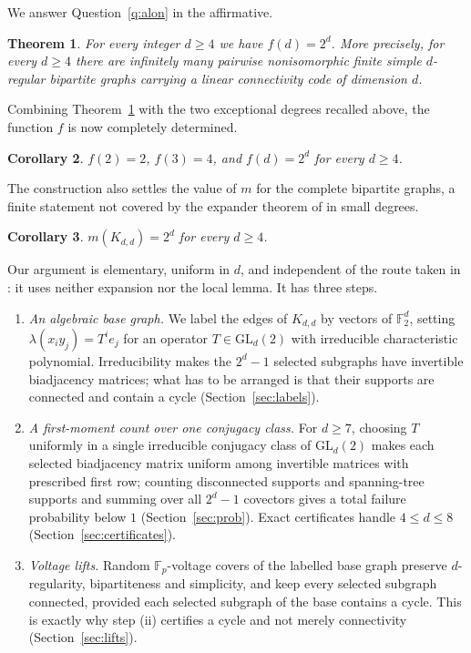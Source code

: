 \documentclass[11pt,reqno]{amsart}
\theoremstyle{plain}
\newtheorem{theorem}{Theorem}[section]
\newtheorem{corollary}[theorem]{Corollary}
\theoremstyle{definition}
\newcommand{\FF}{\mathbb{F}}
\newcommand{\GL}{\mathrm{GL}}
\begin{document}
We answer Question~\ref{q:alon} in the affirmative.

\begin{theorem}\label{thm:main}
For every integer $d\ge 4$ we have $f(d)=2^{d}$. More precisely, for every $d\ge 4$ there are infinitely many pairwise nonisomorphic finite simple $d$-regular bipartite graphs carrying a linear connectivity code of dimension $d$.
\end{theorem}

Combining Theorem~\ref{thm:main} with the two exceptional degrees recalled above, the function $f$ is now completely determined.

\begin{corollary}\label{cor:complete}
$f(2)=2$, $f(3)=4$, and $f(d)=2^{d}$ for every $d\ge 4$.
\end{corollary}

The construction also settles the value of $m$ for the complete bipartite graphs, a finite statement not covered by the expander theorem of \cite{AlonConn} in small degrees.

\begin{corollary}\label{cor:kdd}
$m(K_{d,d})=2^{d}$ for every $d\ge 4$.
\end{corollary}

Our argument is elementary, uniform in $d$, and independent of the route taken in \cite{AlonConn}: it uses neither expansion nor the local lemma. It has three steps.

\begin{enumerate}
\item[(i)] \emph{An algebraic base graph.} We label the edges of $K_{d,d}$ by vectors of $\FF_{2}^{d}$, setting $\lambda(x_{i}y_{j})=T^{i}e_{j}$ for an operator $T\in\GL_{d}(2)$ with irreducible characteristic polynomial. Irreducibility makes the $2^{d}-1$ selected subgraphs have invertible biadjacency matrices; what has to be arranged is that their supports are connected and contain a cycle (Section~\ref{sec:labels}).
\item[(ii)] \emph{A first-moment count over one conjugacy class.} For $d\ge 7$, choosing $T$ uniformly in a single irreducible conjugacy class of $\GL_{d}(2)$ makes each selected biadjacency matrix uniform among invertible matrices with prescribed first row; counting disconnected supports and spanning-tree supports and summing over all $2^{d}-1$ covectors gives a total failure probability below $1$ (Section~\ref{sec:prob}). Exact certificates handle $4\le d\le 8$ (Section~\ref{sec:certificates}).
\item[(iii)] \emph{Voltage lifts.} Random $\FF_{p}$-voltage covers of the labelled base graph preserve $d$-regularity, bipartiteness and simplicity, and keep every selected subgraph connected, provided each selected subgraph of the base contains a cycle. This is exactly why step (ii) certifies a cycle and not merely connectivity (Section~\ref{sec:lifts}).
\end{enumerate}
\end{document}
